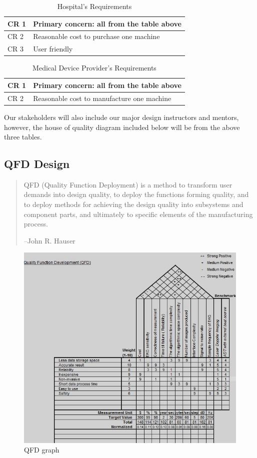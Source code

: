 \documentclass[paper=letter, fontsize=11pt]{scrartcl}
\numberwithin{equation}{section}		%
\numberwithin{figure}{section}			%
\numberwithin{table}{section}			%
\begin{document}
\begin {table}[H]
\centering
\begin{tabular}{l|p{12cm}}
CR 1 & Primary concern: all from the table above \\ \hline
CR 2 & Reasonable cost to purchase one machine \\ \hline
CR 3 & User friendly
\end{tabular}
\caption{Hospital's Requirements}
\label{Hospitals CR}
\end {table}

\begin {table}[H]
\centering
\begin{tabular}{l|p{12cm}}
CR 1 & Primary concern: all from the table above \\ \hline
CR 2 & Reasonable cost to manufacture one machine \\ \hline
\end{tabular}
\caption{Medical Device Provider's Requirements}
\label{Medical Devices CR}
\end {table}

Our stakeholders will also include our major design instructors and mentors, however, the house of quality diagram included below will be from the above three tables.

\subsection{QFD Design}
\begin{quotation}
QFD (Quality Function Deployment) is a method to transform user demands into design quality, to deploy the functions forming quality, and to deploy methods for achieving the design quality into subsystems and component parts, and ultimately to specific elements of the manufacturing process.

\hfill --John R. Hauser
\end{quotation}

\begin{figure}[H]
    \centering
	\includegraphics[scale=1]{qfd.png}
	\caption{QFD graph}
\end{figure}
\end{document}
